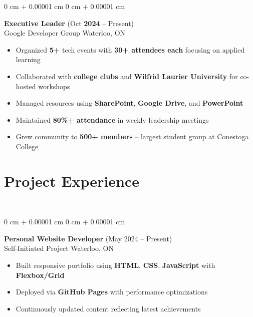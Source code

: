 \documentclass[10pt, letterpaper]{article}
\newenvironment{highlights}{
    \begin{itemize}[
        topsep=0.10 cm,
        parsep=0.10 cm,
        partopsep=0pt,
        itemsep=0pt,
        leftmargin=0 cm + 10pt
    ]
}{
    \end{itemize}
}
\newenvironment{onecolentry}{
    \begin{adjustwidth}{
        0 cm + 0.00001 cm
    }{
        0 cm + 0.00001 cm
    }
}{
    \end{adjustwidth}
}
\begin{document}
\begin{onecolentry}
    {\normalsize \textbf{Executive Leader}} \hfill {(Oct \textbf{2024} – Present)}\\
    {Google Developer Group} \hfill {Waterloo, ON}\\
    \begin{highlights}
        \item Organized \textbf{5+} tech events with \textbf{30+ attendees each} focusing on applied learning
        \item Collaborated with \textbf{college clubs} and \textbf{Wilfrid Laurier University} for co-hosted workshops
        \item Managed resources using \textbf{SharePoint}, \textbf{Google Drive}, and \textbf{PowerPoint}
        \item Maintained \textbf{80\%+ attendance} in weekly leadership meetings
        \item Grew community to \textbf{500+ members} – largest student group at Conestoga College
    \end{highlights}
\end{onecolentry}

\vspace{-12pt}
\section{Project Experience}
\vspace{-12pt}
\hrulefill\\
\begin{onecolentry}
    {\normalsize \textbf{Personal Website Developer}} \hfill {(May 2024 – Present)}\\
    {Self-Initiated Project} \hfill {Waterloo, ON}\\
    \begin{highlights}
        \item Built responsive portfolio using \textbf{HTML}, \textbf{CSS}, \textbf{JavaScript} with \textbf{Flexbox/Grid}
        \item Deployed via \textbf{GitHub Pages} with performance optimizations
        \item Continuously updated content reflecting latest achievements
    \end{highlights}
\end{onecolentry}
\end{document}
